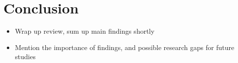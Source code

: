 \section{Conclusion}
\begin{itemize}
    \item Wrap up review, sum up main findings shortly
    \item Mention the importance of findings, and possible research gaps for future studies
\end{itemize}